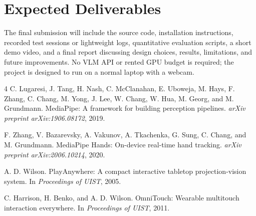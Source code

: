 \documentclass[10pt]{article}
\begin{document}
\section{Expected Deliverables}
The final submission will include the source code, installation instructions, recorded test sessions or lightweight logs, quantitative evaluation scripts, a short demo video, and a final report discussing design choices, results, limitations, and future improvements. No VLM API or rented GPU budget is required; the project is designed to run on a normal laptop with a webcam.

\begin{thebibliography}{4}
\small
{}
C. Lugaresi, J. Tang, H. Nash, C. McClanahan, E. Uboweja, M. Hays, F. Zhang, C. Chang, M. Yong, J. Lee, W. Chang, W. Hua, M. Georg, and M. Grundmann.
\newblock MediaPipe: A framework for building perception pipelines.
\newblock \textit{arXiv preprint arXiv:1906.08172}, 2019.

F. Zhang, V. Bazarevsky, A. Vakunov, A. Tkachenka, G. Sung, C. Chang, and M. Grundmann.
\newblock MediaPipe Hands: On-device real-time hand tracking.
\newblock \textit{arXiv preprint arXiv:2006.10214}, 2020.

A. D. Wilson.
\newblock PlayAnywhere: A compact interactive tabletop projection-vision system.
\newblock In \textit{Proceedings of UIST}, 2005.

C. Harrison, H. Benko, and A. D. Wilson.
\newblock OmniTouch: Wearable multitouch interaction everywhere.
\newblock In \textit{Proceedings of UIST}, 2011.
\end{thebibliography}
\end{document}
